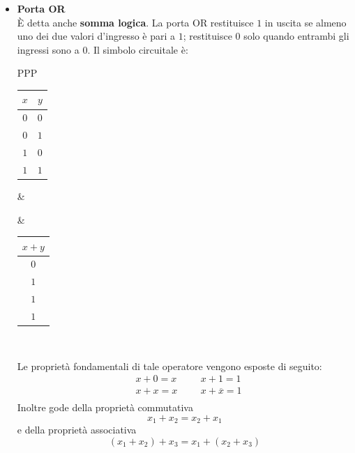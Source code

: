 \documentclass[a4paper]{extarticle}
\begin{document}
\begin{itemize}
    \vspace{1em}
    \noindent
    \item \textbf{Porta OR}\\
    È detta anche \textbf{somma logica}. La porta OR restituisce \(1\) in uscita se almeno uno dei due valori d’ingresso è pari a \(1\); restituisce \(0\) solo quando entrambi gli ingressi sono a \(0\). Il simbolo circuitale è:

    \vspace{1em}
    \noindent
    \begin{tabularx}{\textwidth}{PPP}
    {
        \begin{tabular}{c|c}
             \(x\) & \(y\)\\
             \hline
             $0$ & $0$\\
             $0$ & $1$\\
             $1$ & $0$\\
             $1$ & $1$
        \end{tabular}
    }
    &
    {
    }
    &
    {
        \begin{tabular}{c}
             \(x + y\)\\
             \hline
             $0$\\
             $1$\\
             $1$\\
             $1$
        \end{tabular}
    }\\
    \end{tabularx}
    \vspace{1em}
    \noindent
    Le proprietà fondamentali di tale operatore vengono esposte di seguito:
    \begin{align*}
        &x + 0 = x && &x + 1 =1\\
        &x + x = x && &x + \overline{x}=1\\
    \end{align*}
    Inoltre gode della proprietà commutativa
    \[x_1 + x_2 = x_2 + x_1\]
    e della proprietà associativa
    \[(x_1 + x_2) + x_3 = x_1 + (x_2 + x_3)\]


\end{itemize}
\end{document}
